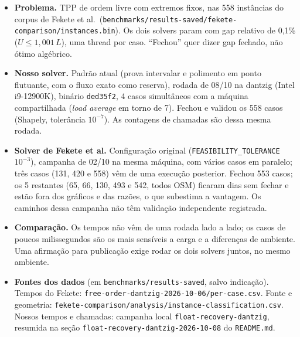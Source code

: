 \documentclass[11pt]{article}
\newcommand{\sect}[1]{\par\medskip{\color{navy}\large\bfseries #1\par}\smallskip}
\begin{document}
\sect{4\quad Dados e limitações}
\begin{itemize}[leftmargin=*,itemsep=2pt]\small\sloppy
\item \textbf{Problema.} TPP de ordem livre com extremos fixos, nas 558 instâncias do corpus de Fekete et al.\ (\nolinkurl{benchmarks/results-saved/fekete-comparison/instances.bin}). Os dois solvers param com gap relativo de 0,1\% (\(U\le1{,}001\,L\)), uma thread por caso. ``Fechou'' quer dizer gap fechado, não ótimo algébrico.
\item \textbf{Nosso solver.} Padrão atual (prova intervalar e polimento em ponto flutuante, com o fluxo exato como reserva), rodada de 08/10 na dantzig (Intel i9-12900K), binário \texttt{ded35f2}, 4 casos simultâneos com a máquina compartilhada (\emph{load average} em torno de 7). Fechou e validou os 558 casos (Shapely, tolerância \(10^{-7}\)). As contagens de chamadas são dessa mesma rodada.
\item \textbf{Solver de Fekete et al.} Configuração original (\texttt{FEASIBILITY\_TOLERANCE} \(10^{-3}\)), campanha de 02/10 na mesma máquina, com vários casos em paralelo; três casos (131, 420 e 558) vêm de uma execução posterior. Fechou 553 casos; os 5 restantes (65, 66, 130, 493 e 542, todos OSM) ficaram dias sem fechar e estão fora dos gráficos e das razões, o que subestima a vantagem. Os caminhos dessa campanha não têm validação independente registrada.
\item \textbf{Comparação.} Os tempos não vêm de uma rodada lado a lado; os casos de poucos milissegundos são os mais sensíveis a carga e a diferenças de ambiente. Uma afirmação para publicação exige rodar os dois solvers juntos, no mesmo ambiente.
\item \textbf{Fontes dos dados} (em \nolinkurl{benchmarks/results-saved}, salvo indicação). Tempos do Fekete: \nolinkurl{free-order-dantzig-2026-10-06/per-case.csv}. Fonte e geometria: \nolinkurl{fekete-comparison/analysis/instance-classification.csv}. Nossos tempos e chamadas: campanha local \nolinkurl{float-recovery-dantzig}, resumida na seção \nolinkurl{float-recovery-dantzig-2026-10-08} do \nolinkurl{README.md}.
\end{itemize}
\end{document}
